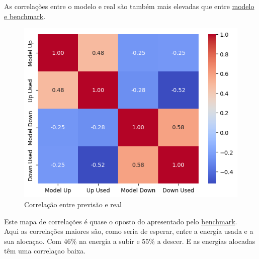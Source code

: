 As correlações entre o modelo e real são também mais elevadas que entre \hyperref[fig:featurecorrelation]{modelo e benchmark}.


\begin{figure}[H]
    \centering
    \includegraphics[width=\textwidth]{plots/heatmap_correlation_pred.png}
    \caption{Correlação entre previsão e real}
    \label{fig:predcorrelation}
  \end{figure}

Este mapa de correlações é quase o oposto do apresentado pelo \hyperref[benchmarkcorr]{benchmark}.\\
Aqui as correlações maiores são, como seria de esperar, entre a energia usada e a sua alocaçao. Com 46\% na energia a subir e 55\% a descer. E as energias alocadas têm uma correlaçao baixa.\\ 